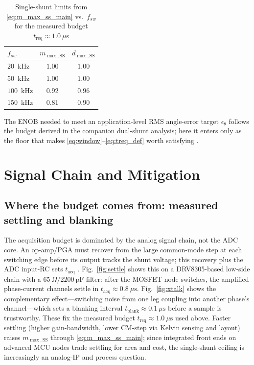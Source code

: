 \documentclass[conference]{IEEEtran}
\newcommand{\tacq}{t_{\mathrm{acq}}}
\newcommand{\tblank}{t_{\mathrm{blank}}}
\newcommand{\treq}{t_{\mathrm{req}}}
\newcommand{\midx}{m}
\newcommand{\dc}{d}
\begin{document}
\begin{table}[t]
\caption{Single-shunt limits from \eqref{eq:m_max_ss_main} vs.\ $f_{sw}$ for the measured budget $\treq\approx1.0~\mu$s}
\label{tab:mmax}
\centering
\begin{tabular}{@{}lcc@{}}
\toprule
$f_{sw}$ & $\midx_{\max,\mathrm{SS}}$ & $\dc_{\max,\mathrm{SS}}$\\
\midrule
$20$~kHz  & $1.00$ & $1.00$\\
$50$~kHz  & $1.00$ & $1.00$\\
$100$~kHz & $0.92$ & $0.96$\\
$150$~kHz & $0.81$ & $0.90$\\
\bottomrule
\end{tabular}
\end{table}

\noindent The ENOB needed to meet an application-level RMS angle-error target $\epsilon_\theta$ follows the budget derived in the companion dual-shunt analysis; here it enters only as the floor that makes \eqref{eq:window}--\eqref{eq:treq_def} worth satisfying \cite{wendler_enhancing_2025}.

\section{Signal Chain and Mitigation}
\subsection{Where the budget comes from: measured settling and blanking}
The acquisition budget is dominated by the analog signal chain, not the ADC core. An op-amp/PGA must recover from the large common-mode step at each switching edge before its output tracks the shunt voltage; this recovery plus the ADC input-RC sets $\tacq$ \cite{Kester2005,TI_SLAAE96A_2023}. Fig.~\ref{fig:settle} shows this on a DRV8305-based low-side chain with a $65~\Omega/2200~\mathrm{pF}$ filter: after the MOSFET node switches, the amplified phase-current channels settle in $\tacq\approx0.8~\mu\mathrm{s}$. Fig.~\ref{fig:xtalk} shows the complementary effect---switching noise from one leg coupling into another phase's channel---which sets a blanking interval $\tblank\approx0.1~\mu\mathrm{s}$ before a sample is trustworthy. These fix the measured budget $\treq\approx1.0~\mu\mathrm{s}$ used above. Faster settling (higher gain-bandwidth, lower CM-step via Kelvin sensing and layout) raises $\midx_{\max,\mathrm{SS}}$ through \eqref{eq:m_max_ss_main}; since integrated front ends on advanced MCU nodes trade settling for area and cost, the single-shunt ceiling is increasingly an analog-IP and process question.
\end{document}
